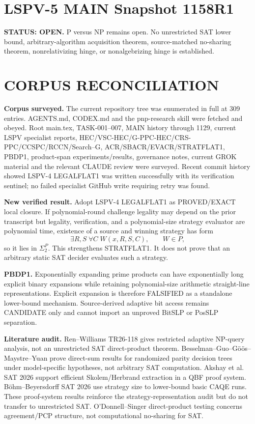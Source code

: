 \documentclass[11pt]{article}
\begin{document}
\section*{LSPV-5 MAIN Snapshot 1158R1}
\textbf{STATUS: OPEN.} P versus NP remains open. No unrestricted SAT lower bound, arbitrary-algorithm acquisition theorem, source-matched no-sharing theorem, nonrelativizing hinge, or nonalgebrizing hinge is established.

\section*{CORPUS RECONCILIATION}
\textbf{Corpus surveyed.} The current repository tree was enumerated in full at 309 entries. AGENTS.md, CODEX.md and the pnp-research skill were fetched and obeyed. Root main.tex, TASK-001--007, MAIN history through 1129, current LSPV specialist reports, HEC/VSC-HEC/G-PPC-HEC/CRS-PPC/CCSPC/RCCN/Search--G, ACR/SBACR/EVACR/STRATFLAT1, PBDP1, product-span experiments/results, governance notes, current GROK material and the relevant CLAUDE review were surveyed. Recent commit history showed LSPV-4 LEGALFLAT1 was written successfully with its verification sentinel; no failed specialist GitHub write requiring retry was found.

\textbf{New verified result.} Adopt LSPV-4 LEGALFLAT1 as PROVED/EXACT local closure. If polynomial-round challenge legality may depend on the prior transcript but legality, verification, and a polynomial-size strategy evaluator are polynomial time, existence of a source and winning strategy has form
\[
\exists R,S\;\forall C\;W(x,R,S,C),\qquad W\in P,
\]
so it lies in \(\Sigma_2^P\). This strengthens STRATFLAT1. It does not prove that an arbitrary static SAT decider evaluates such a strategy.

\textbf{PBDP1.} Exponentially expanding prime products can have exponentially long explicit binary expansions while retaining polynomial-size arithmetic straight-line representations. Explicit expansion is therefore FALSIFIED as a standalone lower-bound mechanism. Source-derived adaptive bit access remains CANDIDATE only and cannot import an unproved BitSLP or PosSLP separation.

\textbf{Literature audit.} Ren--Williams TR26-118 gives restricted adaptive NP-query analysis, not an unrestricted SAT direct-product theorem. Besselman--Guo--Göös--Maystre--Yuan prove direct-sum results for randomized parity decision trees under model-specific hypotheses, not arbitrary SAT computation. Akshay et al. SAT 2026 support efficient Skolem/Herbrand extraction in a QBF proof system. Böhm--Beyersdorff SAT 2026 use strategy size to lower-bound basic CAQE runs. These proof-system results reinforce the strategy-representation audit but do not transfer to unrestricted SAT. O'Donnell--Singer direct-product testing concerns agreement/PCP structure, not computational no-sharing for SAT.
\end{document}
